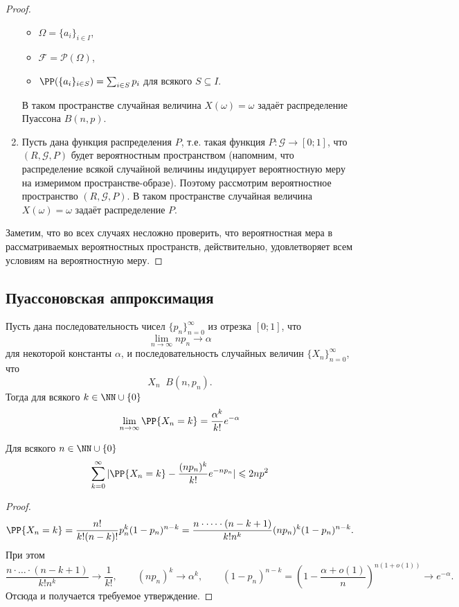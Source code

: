 \documentclass[12pt,a4paper]{article}
\newcommand{\Deq}{\mathop{\stackrel{\mathcal{D}}{=}}}
\begin{document}
\begin{proof}
\begin{enumerate}
                \begin{itemize}
                    \item $\Omega = \{a_i\}_{i \in I}$,
                    \item $\mathcal{F} = \mathcal{P}(\Omega)$,
                    \item $\PP(\{a_i\}_{i \in S}) = \sum_{i \in S} p_i$ для всякого $S \subseteq I$.
                \end{itemize}
                В таком пространстве случайная величина $X(\omega) = \omega$ задаёт распределение Пуассона $B(n, p)$.
            \item Пусть дана функция распределения $P$, т.е. такая функция $P: \mathcal{G} \to [0; 1]$, что $(R, \mathcal{G}, P)$ будет вероятностным пространством (напомним, что распределение всякой случайной величины индуцирует вероятностную меру на измеримом пространстве-образе). Поэтому рассмотрим вероятностное пространство $(R, \mathcal{G}, P)$. В таком пространстве случайная величина $X(\omega) = \omega$ задаёт распределение $P$.
        \end{enumerate}
        Заметим, что во всех случаях несложно проверить, что вероятностная мера в рассматриваемых вероятностных пространств, действительно, удовлетворяет всем условиям на вероятностную меру.
    \end{proof}

    \subsection{Пуассоновская аппроксимация}

    \begin{theorem}
        Пусть дана последовательность чисел $\{p_n\}_{n=0}^\infty$ из отрезка $[0; 1]$, что
        \[\lim_{n \to \infty} n p_n \to \alpha\]
        для некоторой константы $\alpha$, и последовательность случайных величин $\{X_n\}_{n=0}^\infty$, что
        \[X_n \Deq B(n, p_n).\]
        Тогда для всякого $k \in \NN \cup \{0\}$
        \[\lim_{n \to \infty} \PP\{X_n = k\} = \frac{\alpha^k}{k!}e^{-\alpha}\]
            \item Для всякого $n \in \NN \cup \{0\}$
                \[\sum_{k=0}^\infty |\PP\{X_n = k\} - \frac{(np_n)^k}{k!} e^{-np_n}| \leqslant 2np^2\]
            \item 
    \end{theorem}

    \begin{proof}
        \[
            \PP\{X_n = k\}
            = \frac{n!}{k! (n-k)!} p_n^k (1-p_n)^{n-k}
            = \frac{n \cdot \dots \cdot (n-k+1)}{k! n^k} (np_n)^k (1-p_n)^{n-k}.
        \]
        При этом
        \[
            \frac{n \cdot \dots \cdot (n-k+1)}{k! n^k} \to \frac{1}{k!},
            \qquad
            (np_n)^k \to \alpha^k,
            \qquad (1-p_n)^{n-k} = \left(1 - \frac{\alpha + o(1)}{n}\right)^{n(1 + o(1))}
            \to e^{-\alpha}.
        \]
        Отсюда и получается требуемое утверждение.
    \end{proof}
\end{document}
